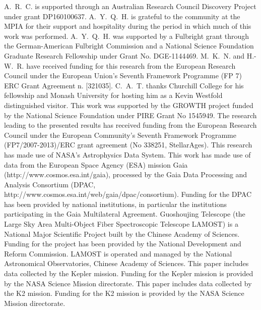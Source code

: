 \documentclass[twocolumn]{aastex62}
\begin{document}
\acknowledgments

A.~R.~C. is supported through an Australian Research Council Discovery Project under grant DP160100637. 
A.~Y.~Q.~H. is grateful to the community at the MPIA for their support and hospitality during the period in which much of this work was performed. 
A.~Y.~Q.~H. was supported by a Fulbright grant through the German-American Fulbright Commission and a National Science Foundation Graduate Research Fellowship under Grant No. DGE-1144469. 
M.~K.~N. and H.-W.~R. have received funding for this research from the European Research Council under the European Union's Seventh Framework Programme (FP 7) ERC Grant Agreement n. [321035].
C.~A.~T. thanks Churchill College for his fellowship and Monash University for hosting him as a Kevin Westfold distinguished visitor.
This work was supported by the GROWTH project funded by the National Science Foundation under PIRE Grant No 1545949.
The research leading to the presented results has received funding from the European Research Council under the European Community's Seventh Framework Programme (FP7/2007-2013)/ERC grant agreement (No 338251, StellarAges).
This research has made use of NASA's Astrophysics Data System.
This work has made use of data from the European Space Agency (ESA) mission Gaia (http://www.cosmos.esa.int/gaia), processed by the Gaia Data Processing and Analysis Consortium (DPAC, http://www.cosmos.esa.int/web/gaia/dpac/consortium). Funding for the DPAC has been provided by national institutions, in particular the institutions participating in the Gaia Multilateral Agreement.
Guoshoujing Telescope (the Large Sky Area Multi-Object Fiber Spectroscopic Telescope LAMOST) is a National Major Scientific Project built by the Chinese Academy of Sciences. Funding for the project has been provided by the National Development and Reform Commission. LAMOST is operated and managed by the National Astronomical Observatories, Chinese Academy of Sciences.
 This paper includes data collected by the Kepler mission. Funding for the Kepler mission is provided by the NASA Science Mission directorate.
 This paper includes data collected by the K2 mission. Funding for the K2 mission is provided by the NASA Science Mission directorate.



%
\end{document}
